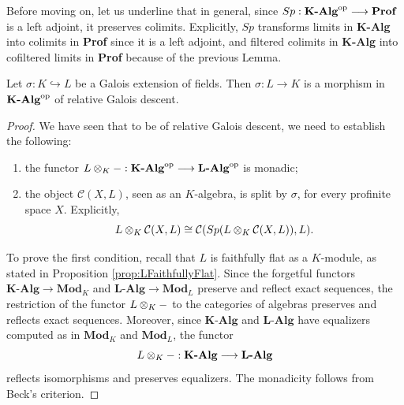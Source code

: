 Before moving on, let us underline that in general, since $Sp:{\textbf{K-Alg}}^{\mathrm{op}}\longrightarrow \textbf{Prof}$ is a left adjoint, it preserves colimits. Explicitly, $Sp$ transforms limits in \textbf{K-Alg} into colimits in \textbf{Prof} since it is a left adjoint, and filtered colimits in \textbf{K-Alg} into cofiltered limits in \textbf{Prof} because of the previous Lemma.
\begin{proposition}
\label{prop:GaloisIsDescent}
    Let $\sigma:K\hookrightarrow L$ be a Galois extension of fields. Then $\sigma:L\to K$ is a morphism in ${\textbf{K-Alg}}^{\mathrm{op}}$ of relative Galois descent.
    \begin{proof}
        We have seen that to be of relative Galois descent, we need to establish the following:
        \begin{enumerate}
            \item the functor $L\otimes_{K}-:{\textbf{K-Alg}}^{\mathrm{op}}\longrightarrow{\textbf{L-Alg}}^{\mathrm{op}}$ is monadic;
            \item the object $\mathcal{C}(X,L)$, seen as an $K$-algebra, is split by $\sigma$, for every profinite space $X$. Explicitly,
            \[ L\otimes_{K}\mathcal{C}(X,L)\cong \mathcal{C}(Sp(L\otimes_{K}\mathcal{C}(X,L)), L). \]
        \end{enumerate}
        To prove the first condition, recall that $L$ is faithfully flat as a $K$-module, as stated in Proposition \ref{prop:LFaithfullyFlat}. Since the forgetful functors $\textbf{K-Alg}\longrightarrow\textbf{Mod}_K$ and $\textbf{L-Alg}\longrightarrow\textbf{Mod}_L$ preserve and reflect exact sequences, the restriction of the functor $L\otimes_{K}-$ to the categories of algebras preserves and reflects exact sequences. Moreover, since $\textbf{K-Alg}$ and $\textbf{L-Alg}$ have equalizers computed as in $\textbf{Mod}_K$ and $\textbf{Mod}_L$, the functor
        \[ L\otimes_{K}-:\textbf{K-Alg}\longrightarrow\textbf{L-Alg} \]
        reflects isomorphisms and preserves equalizers. The monadicity follows from Beck's criterion.


\end{proof}
\end{proposition}
